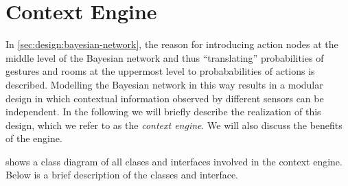 \section{Context Engine}
\label{sec:implementation:context-engine}

In \cref{sec:design:bayesian-network}, the reason for introducing action nodes at the middle level of the Bayesian network and thus ``translating'' probabilities of gestures and rooms at the uppermost level to probababilities of actions is described. Modelling the Bayesian network in this way results in a modular design in which contextual information observed by different sensors can be independent. In the following we will briefly describe the realization of this design, which we refer to as the \emph{context engine}. We will also discuss the benefits of the engine.

 shows a class diagram of all clases and interfaces involved in the context engine. Below is a brief description of the classes and interface.

